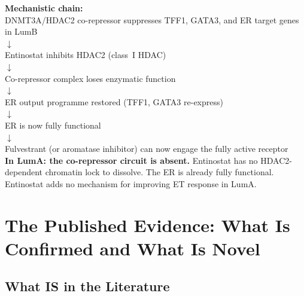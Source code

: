 \documentclass[12pt, a4paper]{article}
\begin{document}
\begin{center}
\colorbox{mechanismbox}{
\begin{minipage}{0.88\textwidth}
\vspace{0.5em}
\textbf{Mechanistic chain:}\\[0.4em]
DNMT3A/HDAC2 co-repressor suppresses
TFF1, GATA3, and ER target genes in LumB\\
$\downarrow$\\
Entinostat inhibits HDAC2 (class~I HDAC)\\
$\downarrow$\\
Co-repressor complex loses enzymatic function\\
$\downarrow$\\
ER output programme restored (TFF1, GATA3
re-express)\\
$\downarrow$\\
ER is now fully functional\\
$\downarrow$\\
Fulvestrant (or aromatase inhibitor) can
now engage the fully active receptor\\[0.4em]
\textbf{In LumA: the co-repressor circuit is
absent.} Entinostat has no HDAC2-dependent
chromatin lock to dissolve. The ER is already
fully functional. Entinostat adds no mechanism
for improving ET response in LumA.
\vspace{0.5em}
\end{minipage}}
\end{center}

\section{The Published Evidence: What Is
Confirmed and What Is Novel}

\subsection{What IS in the Literature}
\end{document}
